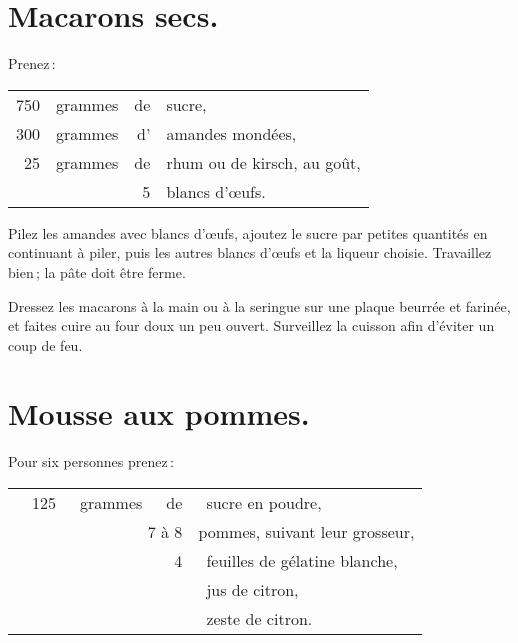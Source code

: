 \section*{\centering Macarons secs.}
{}

Prenez :

\footnotesize
\begin{longtable}{rrrp{16em}}
    750 & grammes & de & sucre,                                                                           \\
    300 & grammes & d' & amandes mondées,                                                                 \\
     25 & grammes & de & rhum ou de kirsch, au goût,                                                      \\
        &         &  5 & blancs d'œufs.                                                                   \\
\end{longtable}
\normalsize

Pilez les amandes avec {\mmm} blancs d'œufs, ajoutez le sucre par petites
quantités en continuant à piler, puis les autres blancs d'œufs et la liqueur
choisie. Travaillez bien ; la pâte doit être ferme.

Dressez les macarons à la main ou à la seringue sur une plaque beurrée et
farinée, et faites cuire au four doux un peu ouvert. Surveillez la cuisson afin
d'éviter un coup de feu.

\section*{\centering Mousse aux pommes.}
{}

Pour six personnes prenez :

\footnotesize
\begin{longtable}{rrrrp{16em}}
  & 125 & grammes & de & sucre en poudre,                                                                 \\
  & & \multicolumn{2}{r}{7 à 8} & pommes, suivant leur grosseur,                                          \\
  &     &         &  4 & feuilles de gélatine blanche,                                                    \\
  &     &         &    & jus de citron,                                                                   \\
  &     &         &    & zeste de citron.                                                                 \\
\end{longtable}
\normalsize

